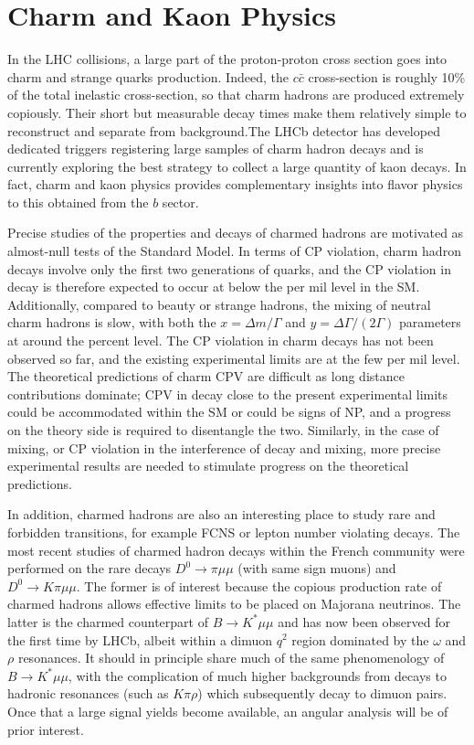 \section{Charm and Kaon Physics}

In the LHC collisions, a large part of the proton-proton cross section goes into charm and strange quarks production.  Indeed, the $c \bar{c}$ cross-section is roughly 10\% of the total inelastic cross-section, so that charm hadrons are produced extremely copiously. Their short but measurable decay times make them relatively simple to reconstruct and separate from background.The LHCb detector has developed dedicated triggers registering  large samples of charm hadron decays and is currently exploring the best strategy to collect a large quantity of kaon decays. In fact, charm and kaon physics provides complementary insights into flavor physics to this obtained from the $b$ sector. 

Precise studies of the properties and decays of charmed hadrons are motivated as almost-null tests of the Standard Model. In terms of CP violation, charm hadron decays involve only the first two generations of quarks, and the CP violation in decay is therefore expected to occur at below the per mil level in the SM. Additionally, compared to beauty or strange hadrons, the mixing of neutral charm hadrons is slow, with both the $x = \Delta m/\Gamma$ and $y = \Delta \Gamma/ (2\Gamma)$ parameters at around the percent level. The CP violation in charm decays has not been observed so far, and the existing experimental limits are at the few per mil level. The theoretical predictions of charm CPV are difficult as long distance contributions dominate; CPV in decay close to the present experimental limits could be accommodated within the SM or could be signs of NP, and a progress on the theory side is required to disentangle the two. Similarly, in the case of mixing, or CP violation in the interference of decay and mixing, more precise experimental results are needed to stimulate progress on the theoretical predictions.

In addition, charmed hadrons are also an interesting place to study rare and forbidden transitions, for example FCNS or lepton number violating decays. The most recent studies of charmed hadron decays within the French community were performed on the rare decays $D^0 \to \pi \mu\mu$ (with same sign muons) and $D^0 \to K \pi\mu\mu$. The former is of interest because the copious production rate of charmed hadrons allows effective limits to be placed on Majorana neutrinos. The latter is the charmed counterpart of $B\to K^*\mu\mu$ and has now been observed for the first time by LHCb, albeit within a dimuon $q^2$ region dominated by the $\omega$ and $\rho$ resonances. It should in principle share much of the same phenomenology of $B\to K^*\mu\mu$,  with the complication of much higher backgrounds from decays to hadronic resonances (such as $K\pi\rho$) which subsequently decay to dimuon pairs. Once that a large signal yields become available, an angular analysis will be of prior interest. 


